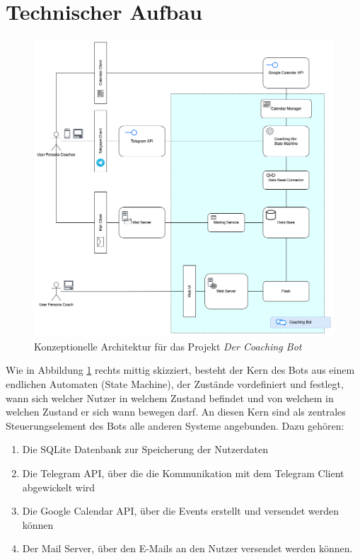 \section{Technischer Aufbau}

	\begin{figure} %
		\centering
		\includegraphics[width=1.0\textwidth]{images/220320_PA28464_Architecture.png}
		\caption{Konzeptionelle Architektur für das Projekt \emph{Der Coaching Bot}}
		\label{fig: architecture}
	\end{figure}

	Wie in Abbildung \ref{fig: architecture} rechts mittig skizziert, besteht der Kern des Bots aus einem endlichen Automaten (State Machine), der Zustände vordefiniert und festlegt, wann sich welcher Nutzer in welchem Zustand befindet und von welchem in welchen Zustand er sich wann bewegen darf. An diesen Kern sind als zentrales Steuerungselement des Bots alle anderen Systeme angebunden. Dazu gehören:
	\begin{enumerate}
		\item Die SQLite Datenbank zur Speicherung der Nutzerdaten
		\item Die Telegram API, über die die Kommunikation mit dem Telegram Client abgewickelt wird
		\item Die Google Calendar API, über die Events erstellt und versendet werden können
		\item Der Mail Server, über den E-Mails an den Nutzer versendet werden können.
	\end{enumerate} 

